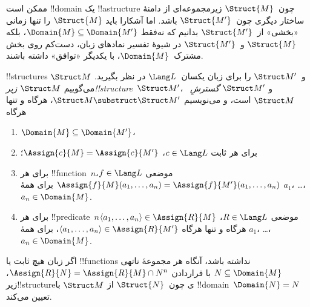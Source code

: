 \documentclass[../../../include/open-logic-section]{subfiles}
\begin{document}

ممکن است !!{domain} یک !!a{structure} چون~$\Struct{M}$ زیرمجموعه‌ای از
دامنهٔ ساختار دیگری چون~$\Struct{M'}$ باشد. اما آشکارا باید
$\Struct{M}$ را تنها زمانی «بخشی» از~$\Struct{M'}$ بدانیم که نه‌فقط
$\Domain{M} \subseteq \Domain{M'}$، بلکه $\Struct{M}$ و~$\Struct{M'}$
در شیوهٔ تفسیر نمادهای زبان، دست‌کم روی بخش مشترک~$\Domain{M}$، با
یکدیگر «توافق» داشته باشند.

\begin{defn}
!!{structure}s $\Struct M$ و~$\Struct M'$ را برای زبان یکسان~$\Lang L$
در نظر بگیرید. می‌گوییم $\Struct M$
\emph{زیر!!{structure}}~$\Struct M'$، و $\Struct M'$
\emph{گسترشِ}~$\Struct M$ است، و می‌نویسیم
$\Struct M \substruct \Struct M'$، هرگاه و تنها هرگاه
\begin{enumerate}
\item $\Domain{M} \subseteq \Domain{M'}$،
\item برای هر ثابت $c \in \Lang L$، $\Assign{c}{M} =
    \Assign{c}{M'}$؛
\item برای هر !!{function}~$n$موضعی $f \in \Lang L$،
  $\Assign{f}{M}(a_1, \dots, a_n) = \Assign{f}{M'}(a_1, \dots, a_n)$
  برای همهٔ $a_1$، \dots، $a_n \in \Domain{M}$.
\item برای هر !!{predicate}~$n$موضعی $R \in \Lang L$،
  $\langle a_1, \dots, a_n\rangle \in \Assign{R}{M}$ هرگاه و تنها
  هرگاه $\langle a_1, \dots, a_n\rangle \in \Assign{R}{M'}$، برای
  همهٔ $a_1$، \dots، $a_n \in \Domain{M}$.
\end{enumerate}
\end{defn}

\begin{rem}
اگر زبان هیچ ثابت یا !!{function}s نداشته باشد، آنگاه هر مجموعهٔ ناتهی
$N \subseteq \Domain{M}$ با قراردادن $\Assign{R}{N} =
\Assign{R}{M} \cap N^n$، زیر!!{structure}ی چون~$\Struct{N}$ از
$\Struct M$ با !!{domain}~$\Domain{N} = N$ تعیین می‌کند.
\end{rem}

\end{document}
